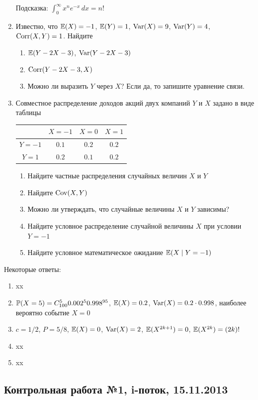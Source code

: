 \documentclass[12pt, a4paper]{article}\usepackage[]{graphicx}\usepackage[]{color}
\begin{document}
\begin{enumerate}
Подсказка: $\int_0^{\infty} x^n e^{-x} \, dx=n!$

\item Известно, что  $\E(X)=-1$, $\E(Y)=1$, $\Var(X)=9$, $\Var(Y)=4$, $\Corr(X,Y)=1$. Найдите
\begin{enumerate}
\item $\E(Y-2X-3)$, $\Var(Y-2X-3)$
\item  $\Corr(Y-2X-3,X)$
\item Можно ли выразить $Y$ через $X$? Если да, то запишите уравнение связи.
\end{enumerate}

\item Совместное распределение доходов акций двух компаний $Y$ и $X$ задано в виде таблицы

\begin{tabular}{c|ccc}
 & $X=-1$ & $X=0$ & $X=1$ \\
\hline
$Y=-1$ & $0.1$ & $0.2$ & $0.2$ \\
$Y=1$ & $0.2$ & $0.1$ & $0.2$ \\
\end{tabular}


\begin{enumerate}
\item Найдите  частные распределения случайных величин $X$ и $Y$
\item Найдите $\Cov(X,Y)$
\item Можно ли утверждать, что случайные величины $X$ и $Y$ зависимы?
\item Найдите условное распределение случайной величины $X$ при условии $Y=-1$
\item Найдите условное математическое ожидание $\E(X\mid Y=-1)$
\end{enumerate}


\end{enumerate}

Некоторые ответы:
\begin{enumerate}
\item xx
\item $\P(X=5)=C_{100}^5 0.002^5 0.998^{95}$, $\E(X)=0.2$, $\Var(X)=0.2\cdot 0.998$, наиболее вероятно событие $X=0$
\item $c=1/2$, $P=5/8$, $\E(X)=0$, $\Var(X)=2$, $\E(X^{2k+1})=0$, $\E(X^{2k})=(2k)!$
\item xx
\item xx
\end{enumerate}



\subsection{Контрольная работа №1, i-поток, 15.11.2013}
\end{document}
